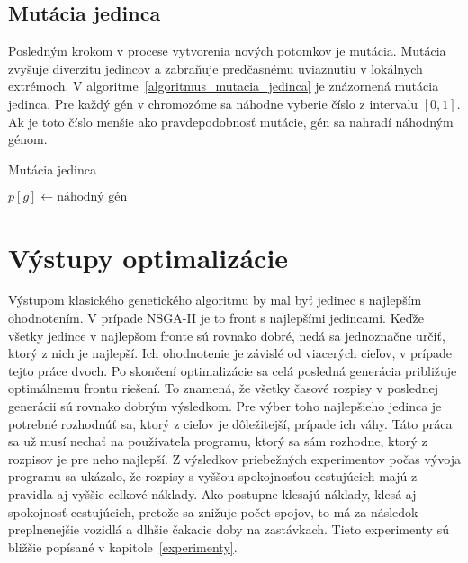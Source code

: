 \subsection*{Mutácia jedinca}
Posledným krokom v procese vytvorenia nových potomkov je mutácia.
Mutácia zvyšuje diverzitu jedincov a zabraňuje predčasnému uviaznutiu v lokálnych extrémoch.
V algoritme~\ref{algoritmus_mutacia_jedinca} je znázornená mutácia jedinca.
Pre každý gén v chromozóme sa náhodne vyberie číslo z intervalu $[0,1]$.
Ak je toto číslo menšie ako pravdepodobnosť mutácie, gén sa nahradí náhodným génom.

\vspace*{\dimexpr0.5\baselineskip\relax}
\begin{algorithm}[h]\label{algoritmus_mutacia_jedinca}
\caption{Mutácia jedinca}
   {
     {
      $p[g] \gets \text{náhodný gén}$\;
    }
  }
\end{algorithm}

\section{Výstupy optimalizácie}\label{vystupy_optimalizacie}

Výstupom klasického genetického algoritmu by mal byť jedinec s najlepším ohodnotením.
V prípade NSGA-II je to front s najlepšími jedincami.
Keďže všetky jedince v najlepšom fronte sú rovnako dobré, nedá sa jednoznačne určiť, ktorý z nich je najlepší.
Ich ohodnotenie je závislé od viacerých cieľov, v prípade tejto práce dvoch.
Po skončení optimalizácie sa celá posledná generácia približuje optimálnemu frontu riešení.
To znamená, že všetky časové rozpisy v poslednej generácii sú rovnako dobrým výsledkom.
Pre výber toho najlepšieho jedinca je potrebné rozhodnúť sa, ktorý z cieľov je dôležitejší, prípade ich váhy.
Táto práca sa už musí nechať na používateľa programu, ktorý sa sám rozhodne, ktorý z rozpisov je pre neho najlepší.
Z výsledkov priebežných experimentov počas vývoja programu sa ukázalo, že rozpisy s vyššou spokojnosťou cestujúcich majú z pravidla aj vyššie celkové náklady.
Ako postupne klesajú náklady, klesá aj spokojnosť cestujúcich, pretože sa znižuje počet spojov, to má za následok preplnenejšie vozidlá a dlhšie čakacie doby na zastávkach.
Tieto experimenty sú bližšie popísané v kapitole~\ref{experimenty}.

